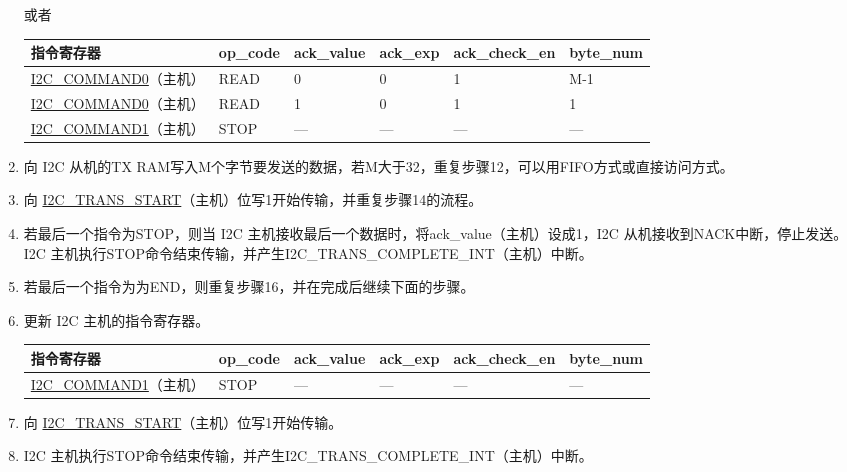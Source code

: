 \documentclass[main\_\_CN.tex]{subfiles}
\begin{document}
\begin{enumerate}
或者

\begin{longtable}{ | p{4cm} | p{2cm} | p{2cm} | p{2cm} |p{2cm} | p{2cm} |}
\hline\rowcolor{lightgray}
指令寄存器& op\_code & ack\_value&ack\_exp&ack\_check\_en&byte\_num  \\ \hline
\hyperref[fielddesc:I2CCOMMAND0]{I2C\_COMMAND0}（主机）& READ& 0&0&1&M-1  \\ \hline
\hyperref[fielddesc:I2CCOMMAND0]{I2C\_COMMAND0}（主机）& READ& 1&0&1&1  \\ \hline
\hyperref[fielddesc:I2CCOMMAND1]{I2C\_COMMAND1}（主机）& STOP& ---&---&---&---  \\ \hline
\end{longtable}

\item 向 I2C 从机的TX RAM写入M个字节要发送的数据，若M大于32，重复步骤12，可以用FIFO方式或直接访问方式。
\item 向 \hyperref[fielddesc:I2CTRANSSTART]{I2C\_TRANS\_START}（主机）位写1开始传输，并重复步骤14的流程。
\item 若最后一个指令为STOP，则当 I2C 主机接收最后一个数据时，将ack\_value（主机）设成1，I2C 从机接收到NACK中断，停止发送。 I2C 主机执行STOP命令结束传输，并产生I2C\_TRANS\_COMPLETE\_INT（主机）中断。
\item 若最后一个指令为为END，则重复步骤16，并在完成后继续下面的步骤。
\item 更新 I2C 主机的指令寄存器。
\begin{longtable}{ | p{4cm} | p{2cm} | p{2cm} | p{2cm} |p{2cm} | p{2cm} |}
\hline\rowcolor{lightgray}
指令寄存器& op\_code & ack\_value&ack\_exp&ack\_check\_en&byte\_num  \\ \hline
\hyperref[fielddesc:I2CCOMMAND1]{I2C\_COMMAND1}（主机）& STOP& ---&---&---&---  \\ \hline
\end{longtable}
\item 向 \hyperref[fielddesc:I2CTRANSSTART]{I2C\_TRANS\_START}（主机）位写1开始传输。
\item I2C 主机执行STOP命令结束传输，并产生I2C\_TRANS\_COMPLETE\_INT（主机）中断。

\end{enumerate}
\end{document}
